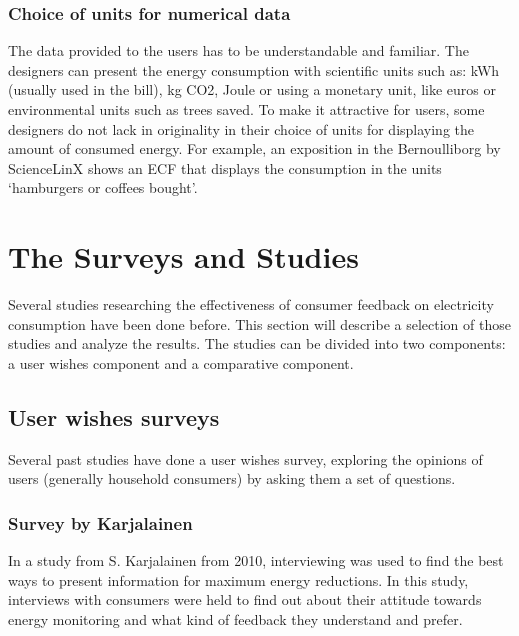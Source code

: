 \documentclass[journal]{vgtc}                %
\begin{document}
\subsubsection{Choice of units for numerical data}
The data provided to the users has to be understandable and familiar. The designers can present the energy consumption with scientific units such as: kWh (usually used in the bill), kg CO2, Joule or using a monetary unit, like euros or environmental units such as trees saved.
To make it attractive for users, some designers do not lack in originality in their choice of units for displaying the amount of consumed energy. For example, an exposition in the Bernoulliborg by ScienceLinX shows an ECF that displays the consumption in the units ‘hamburgers or coffees bought’.


\section{The Surveys and Studies}
Several studies researching the effectiveness of consumer feedback on electricity consumption have been done before.
This section will describe a selection of those studies and analyze the results.
The studies can be divided into two components: a user wishes component and a comparative component.
 

\subsection{User wishes surveys}
Several past studies have done a user wishes survey, exploring the opinions of users (generally household consumers) by asking them a set of questions. 

\subsubsection{Survey by Karjalainen}
In a study from S. Karjalainen \cite{karjalainen2011consumer} from 2010, interviewing was used to find the best ways to present information for maximum energy reductions. In this study, interviews with consumers were held to find out about their attitude towards energy monitoring and what kind of feedback they understand and prefer.
\end{document}

